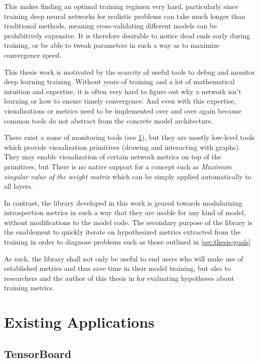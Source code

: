    This makes finding an optimal training regimen very hard, particularly
    since training deep neural networks for realistic problems can take much
    longer than traditional methods, meaning cross-validating different
    models can be prohibitively expensive. It is therefore desirable to
    notice dead ends early during training, or be able to tweak parameters
    in such a way as to maximize convergence speed.

    This thesis work is motivated by the scarcity of useful tools to debug
    and monitor deep learning training. Without years of training and a lot
    of mathematical intuition and expertise, it is often very hard to figure
    out why a network isn't learning or how to ensure timely convergence.
    And even with this expertise, visualizations or metrics need to be
    implemented over and over again because common tools do not abstract
    from the concrete model architecture.

    There exist a some of monitoring tools (see \cref{sec:existing-apps}),
    but they are mostly low-level tools which provide visualization
    primitives (drawing and interacting with graphs). They may enable
    visualization of certain network metrics on top of the primitives, but
    There is no native support for a concept such as \emph{Maximum singular
    value of the weight matrix} which can be simply applied automatically to
    all layers.

    In contrast, the library developed in this work is geared towards
    modularizing introspection metrics in such a way that they are usable
    for any kind of model, without modifications to the model code. The
    secondary purpose of the library is the enablement to quickly iterate on
    hypothesized metrics extracted from the training in order to diagnose
    problems such as those outlined in \cref{sec:thesis-goals}

    As such, the library shall not only be useful to end users who will make
    use of established metrics and thus save time in their model training,
    but also to researchers and the author of this thesis in for evaluating
    hypotheses about training metrics.

    \hypertarget{sec:existing-apps}{%
    \section{Existing Applications}\label{sec:existing-apps}}

    \hypertarget{tensorboard}{%
    \subsection*{TensorBoard}\label{tensorboard}}

